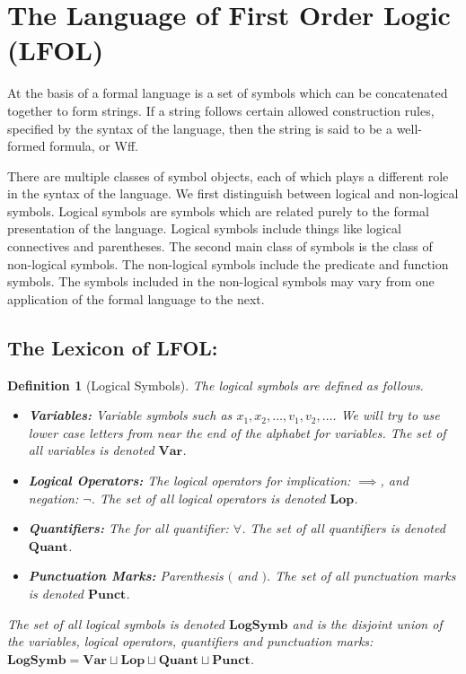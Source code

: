\documentclass[12pt]{article}
\theoremstyle{break}
\newtheorem{definition}{Definition}[section]
\theoremstyle{break}
\theoremstyle{break}
\theoremstyle{break}
\begin{document}
\newpage
\section{The Language of First Order Logic (LFOL)}

At the basis of a formal language is a set of symbols which can be concatenated together to form strings.
If a string follows certain allowed construction rules, specified by the syntax of the language, then the string is said to be a well-formed formula, or Wff.

There are multiple classes of symbol objects, each of which plays a different role in the syntax of the language. 
We first distinguish between logical and non-logical symbols. 
Logical symbols are symbols which are related purely to the formal presentation of the language.
Logical symbols include things like logical connectives and parentheses.
The second main class of symbols is the class of non-logical symbols.
The non-logical symbols include the predicate and function symbols.
The symbols included in the non-logical symbols may vary from one application of the formal language to the next.


\subsection{The Lexicon of LFOL:}

\begin{definition}[Logical Symbols]
The logical symbols are defined as follows.
\begin{itemize}
\item{\textbf{Variables:} Variable symbols such as $x_1, x_2, \ldots, v_1, v_2, \ldots$. We will try to use lower case letters from near the end of the alphabet for variables. The set of all variables is denoted $\textbf{Var}$.}
\item{\textbf{Logical Operators:} The logical operators for implication: $\implies$, and negation: $\lnot$. The set of all logical operators is denoted $\textbf{Lop}$.}
\item{\textbf{Quantifiers:} The for all quantifier: $\forall$. The set of all quantifiers is denoted $\textbf{Quant}$.}
\item{\textbf{Punctuation Marks:} Parenthesis $($ and $)$. The set of all punctuation marks is denoted $\textbf{Punct}$.}
\end{itemize}


The set of all logical symbols is denoted $\textbf{LogSymb}$ and is the disjoint union of the variables, logical operators, quantifiers and punctuation marks: $\textbf{LogSymb} = \textbf{Var} \sqcup \textbf{Lop} \sqcup \textbf{Quant} \sqcup \textbf{Punct}$.
\end{definition}
\end{document}
